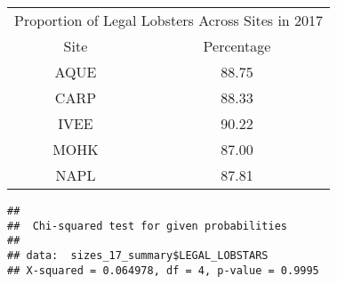 \documentclass[]{article}
\newenvironment{Shaded}{\begin{snugshade}}{\end{snugshade}}
\newcommand{\KeywordTok}[1]{\textcolor[rgb]{0.13,0.29,0.53}{\textbf{#1}}}
\newcommand{\StringTok}[1]{\textcolor[rgb]{0.31,0.60,0.02}{#1}}
\newcommand{\CommentTok}[1]{\textcolor[rgb]{0.56,0.35,0.01}{\textit{#1}}}
\newcommand{\OperatorTok}[1]{\textcolor[rgb]{0.81,0.36,0.00}{\textbf{#1}}}
\newcommand{\NormalTok}[1]{#1}
\begin{document}
\begin{table}[H]
\centering
\begin{tabular}{c|c}
\hline
\multicolumn{2}{|c}{Proportion of Legal Lobsters Across Sites in 2017} \\
\cline{1-2}
Site & Percentage\\
\hline
AQUE & 88.75\\
\hline
CARP & 88.33\\
\hline
IVEE & 90.22\\
\hline
MOHK & 87.00\\
\hline
NAPL & 87.81\\
\hline
\end{tabular}
\end{table}

\begin{Shaded}
\end{Shaded}

\begin{verbatim}
## 
##  Chi-squared test for given probabilities
## 
## data:  sizes_17_summary$LEGAL_LOBSTARS
## X-squared = 0.064978, df = 4, p-value = 0.9995
\end{verbatim}
\end{document}
